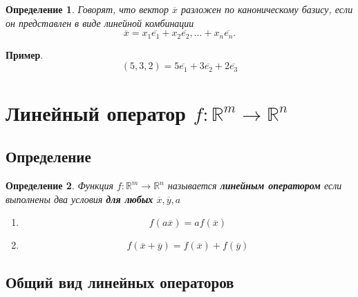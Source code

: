 \documentclass[]{article}
\newtheorem{definition}{Определение}
\begin{document}
	\begin{definition}
		Говорят, что вектор $\overline{x}$ разложен по каноническому базису, если он представлен в виде линейной комбинации
		$$\overline{x}=x_1\overline{e_1}+ x_2\overline{e_2},\ldots+ x_n\overline{e_n}.$$
	\end{definition}
	\textbf{Пример}.
	\begin{equation*}
		(5,3,2) = 5\overline{e_1}+3\overline{e_2}+2\overline{e_3}
	\end{equation*} 
	
	\section{Линейный оператор $f:\mathbb{R}^m\rightarrow\mathbb{R}^n$}
	\subsection{Определение}
	\begin{definition}
		Функция $f:\mathbb{R}^m\rightarrow\mathbb{R}^n$ называется \textbf{линейным оператором} если выполнены два условия \textbf{для любых} $\overline{x}, \overline{y}, a$
		\begin{enumerate}
			\item $$f(a\overline{x})=af(\overline{x})$$
			\item $$f(\overline{x}+\overline{y})=f(\overline{x})+f(\overline{y})$$
		\end{enumerate}
	\end{definition}
	
	\subsection{Общий вид линейных операторов}
\end{document}
